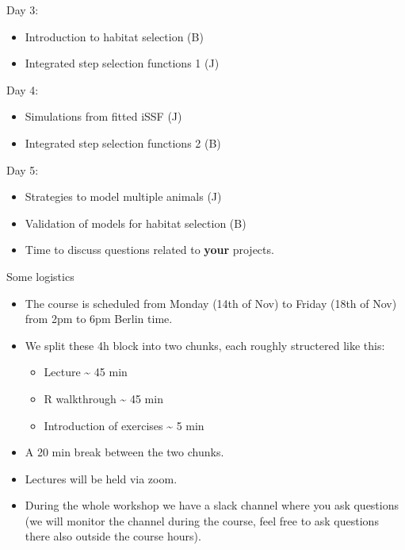 \documentclass[ignorenonframetext,,t]{beamer}
\let\oldtextbf\textbf
\renewcommand{\textbf}[1]{\textcolor{spamwell}{\oldtextbf{#1}}}
\providecommand{\tightlist}{%
\setlength{\itemsep}{0pt}\setlength{\parskip}{0pt}}
\providecommand{\tightlist}{%
\setlength{\itemsep}{0pt}\setlength{\parskip}{0pt}}
\renewcommand{\tightlist}{\setlength{\itemsep}{1.4ex}\setlength{\parskip}{0pt}}
\begin{document}
\begin{frame}
\begin{block}{Day 3:}
\protect\hypertarget{day-3}{}
\begin{itemize}
\tightlist
\item
  Introduction to habitat selection (B)
\item
  Integrated step selection functions 1 (J)
\end{itemize}
\end{block}

\begin{block}{Day 4:}
\protect\hypertarget{day-4}{}
\begin{itemize}
\tightlist
\item
  Simulations from fitted iSSF (J)
\item
  Integrated step selection functions 2 (B)
\end{itemize}
\end{block}

\begin{block}{Day 5:}
\protect\hypertarget{day-5}{}
\begin{itemize}
\tightlist
\item
  Strategies to model multiple animals (J)
\item
  Validation of models for habitat selection (B)
\item
  Time to discuss questions related to \textbf{your} projects.
\end{itemize}
\end{block}
\end{frame}

\begin{frame}
\begin{block}{Some logistics}
\protect\hypertarget{some-logistics}{}
\begin{itemize}
\item
  The course is scheduled from Monday (14th of Nov) to Friday (18th of
  Nov) from 2pm to 6pm Berlin time.
\item
  We split these 4h block into two chunks, each roughly structered like
  this:

  \begin{itemize}
  \tightlist
  \item
    Lecture \textasciitilde{} 45 min
  \item
    R walkthrough \textasciitilde{} 45 min
  \item
    Introduction of exercises \textasciitilde{} 5 min
  \end{itemize}
\item
  A 20 min break between the two chunks.
\item
  Lectures will be held via zoom.
\item
  During the whole workshop we have a slack channel where you ask
  questions (we will monitor the channel during the course, feel free to
  ask questions there also outside the course hours).
\end{itemize}
\end{block}
\end{frame}
\end{document}
